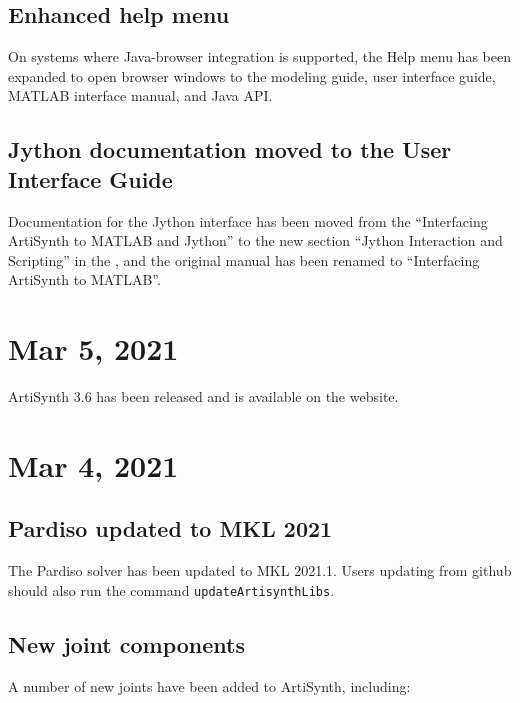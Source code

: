 \documentclass{article}
\begin{document}
\subsection*{Enhanced help menu}

On systems where Java-browser integration is supported, the {\sf Help}
menu has been expanded to open browser windows to the modeling guide,
user interface guide, MATLAB interface manual, and Java API.

\subsection*{Jython documentation moved to the User Interface Guide}

Documentation for the Jython interface has been moved from the
``Interfacing ArtiSynth to MATLAB and Jython'' to the new section
``Jython Interaction and Scripting'' in the
, and the original
manual has been renamed to ``Interfacing ArtiSynth to MATLAB''.

\section*{Mar 5, 2021}

ArtiSynth 3.6 has been released and is available on the website.

\section*{Mar 4, 2021}

\subsection*{Pardiso updated to MKL 2021}

The Pardiso solver has been updated to MKL 2021.1. Users updating from
github should also run the command {\tt updateArtisynthLibs}.

\subsection*{New joint components}

A number of new joints have been added to ArtiSynth, including:
\end{document}
